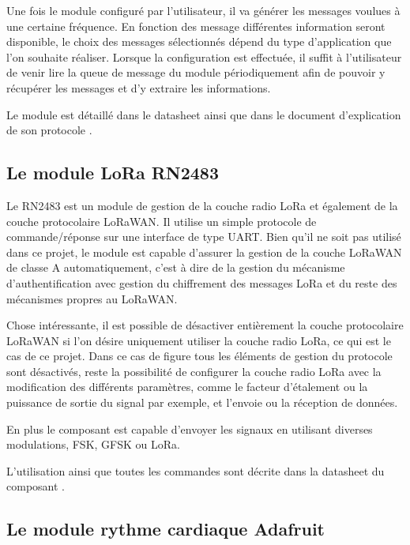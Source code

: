 Une fois le module configuré par l'utilisateur, il va générer les messages voulues à une certaine fréquence. En fonction des message différentes information seront disponible, le choix des messages sélectionnés dépend du type d'application que l'on souhaite réaliser. Lorsque la configuration est effectuée, il suffit à l'utilisateur de venir lire la queue de message du module périodiquement afin de pouvoir y récupérer les messages et d'y extraire les informations.

Le module est détaillé dans le datasheet \cite{ublox-datasheet} ainsi que dans le document d'explication de son protocole \cite{ublox-protocol}.

\subsection{Le module LoRa RN2483}\label{ch:module_rn2483}


Le RN2483 est un module de gestion de la couche radio LoRa et également de la couche protocolaire LoRaWAN. Il utilise un simple protocole de commande/réponse sur une interface de type UART. Bien qu'il ne soit pas utilisé dans ce projet, le module est capable d'assurer la gestion de la couche LoRaWAN de classe A automatiquement, c'est à dire de la gestion du mécanisme d'authentification avec gestion du chiffrement des messages LoRa et du reste des mécanismes propres au LoRaWAN.

Chose intéressante, il est possible de désactiver entièrement la couche protocolaire LoRaWAN si l'on désire uniquement utiliser la couche radio LoRa, ce qui est le cas de ce projet. Dans ce cas de figure tous les éléments de gestion du protocole sont désactivés, reste la possibilité de configurer la couche radio LoRa avec la modification des différents paramètres, comme le facteur d'étalement ou la puissance de sortie du signal par exemple, et l'envoie ou la réception de données.

En plus le composant est capable d'envoyer les signaux en utilisant diverses modulations, FSK, GFSK ou LoRa.

L'utilisation ainsi que toutes les commandes sont décrite dans la datasheet du composant \cite{rn2483-datasheet}.

\subsection{Le module rythme cardiaque Adafruit}\label{ch:module_hr}

